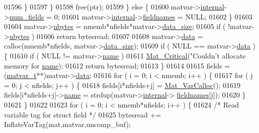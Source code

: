 \begin{DoxyCode}
{{{{{{{{{{{01596                 \}
01597             \}
01598             free(ptr);
01599         \} \textcolor{keywordflow}{else} \{
01600             matvar->\hyperlink{group___m_a_t_a6e97e3ed9f40c49322c18561c2a94e92}{internal}->\hyperlink{structmatvar__internal_a93fc447484f455eddf9334f2e9e411c2}{num\_fields} = 0;
01601             matvar->\hyperlink{group___m_a_t_a6e97e3ed9f40c49322c18561c2a94e92}{internal}->\hyperlink{structmatvar__internal_a7574d000bfc98ad4860ae6590b8d4985}{fieldnames} = NULL;
01602         \}
01603 
01604         matvar->\hyperlink{group___m_a_t_abf1c844540503be2df9bb3db93cfe307}{nbytes} = nmemb*nfields*matvar->\hyperlink{group___m_a_t_a9ad1c82e2b568da617e12dc73a26e1f9}{data\_size};
01605         \textcolor{keywordflow}{if} ( !matvar->\hyperlink{group___m_a_t_abf1c844540503be2df9bb3db93cfe307}{nbytes} )
01606             \textcolor{keywordflow}{return} bytesread;
01607 
01608         matvar->\hyperlink{group___m_a_t_a5672978efa230bbdecdf38ede781f7fa}{data} = calloc(nmemb*nfields, matvar->\hyperlink{group___m_a_t_a9ad1c82e2b568da617e12dc73a26e1f9}{data\_size});
01609         \textcolor{keywordflow}{if} ( NULL == matvar->\hyperlink{group___m_a_t_a5672978efa230bbdecdf38ede781f7fa}{data} ) \{
01610             \textcolor{keywordflow}{if} ( NULL != matvar->\hyperlink{group___m_a_t_a5d4b55b041e3b4fb50c04337f05ad909}{name} )
01611                 \hyperlink{group__mat__util_gaf51f2bfbb5580f575e4dd79757e2b80c}{Mat\_Critical}(\textcolor{stringliteral}{"Couldn't allocate memory for %
      \hyperlink{group___m_a_t_a5d4b55b041e3b4fb50c04337f05ad909}{name});
01612             \textcolor{keywordflow}{return} bytesread;
01613         \}
01614 
01615         fields = (\hyperlink{group___m_a_t_structmatvar__t}{matvar\_t}**)matvar->\hyperlink{group___m_a_t_a5672978efa230bbdecdf38ede781f7fa}{data};
01616         for ( i = 0; i < nmemb; i++ ) \{
01617             \textcolor{keywordflow}{for} ( j = 0; j < nfields; j++ ) \{
01618                 fields[i*nfields+j] = \hyperlink{group___m_a_t_gae7c9c3699f6e9c31a9c490300013098c}{Mat\_VarCalloc}();
01619                 fields[i*nfields+j]->\hyperlink{group___m_a_t_a5d4b55b041e3b4fb50c04337f05ad909}{name} = strdup(matvar->\hyperlink{group___m_a_t_a6e97e3ed9f40c49322c18561c2a94e92}{internal}->
      \hyperlink{structmatvar__internal_a7574d000bfc98ad4860ae6590b8d4985}{fieldnames}[j]);
01620             \}
01621         \}
01622 
01623         \textcolor{keywordflow}{for} ( i = 0; i < nmemb*nfields; i++ ) \{
01624             \textcolor{comment}{/* Read variable tag for struct field */}
01625             bytesread += InflateVarTag(mat,matvar,uncomp\_buf);
}}}}}}}}}}}}
\end{DoxyCode}
